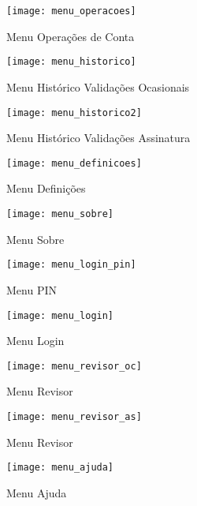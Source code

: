 \begin{figure}[ht]
\begin{minipage}[b]{0.31\linewidth}
\centering
\texttt{[image: menu\_operacoes]}
    \caption{Menu Operações de Conta}
    \label{fig:menu_operacoes}
\end{minipage}
\hspace{0.25cm}
\begin{minipage}[b]{0.31\linewidth}
\centering
    \texttt{[image: menu\_historico]}
    \caption{Menu Histórico Validações Ocasionais}
    \label{fig:menu_historico}
\end{minipage}
\hspace{0.25cm}
\begin{minipage}[b]{0.31\linewidth}
\centering
    \texttt{[image: menu\_historico2]}
    \caption{Menu Histórico Validações Assinatura}
    \label{fig:menu_historico2}
\end{minipage}
\end{figure}

\begin{figure}[ht]
\begin{minipage}[b]{0.45\linewidth}
\centering
\texttt{[image: menu\_definicoes]}
    \caption{Menu Definições}
    \label{fig:menu_definicoes}
\end{minipage}
\hspace{0.5cm}
\begin{minipage}[b]{0.45\linewidth}
\centering
    \texttt{[image: menu\_sobre]}
    \caption{Menu Sobre}
    \label{fig:menu_sobre}
\end{minipage}
\end{figure}

\begin{figure}[ht]
\begin{minipage}[b]{0.45\linewidth}
\centering
\texttt{[image: menu\_login\_pin]}
    \caption{Menu PIN}
    \label{fig:menu_login_pin}
\end{minipage}
\hspace{0.5cm}
\begin{minipage}[b]{0.45\linewidth}
\centering
    \texttt{[image: menu\_login]}
    \caption{Menu Login}
    \label{fig:menu_login}
\end{minipage}
\end{figure}

\begin{figure}[ht]
\begin{minipage}[b]{0.45\linewidth}
\centering
\texttt{[image: menu\_revisor\_oc]}
    \caption{Menu Revisor}
    \label{fig:menu_revisor_oc}
\end{minipage}
\hspace{0.5cm}
\begin{minipage}[b]{0.45\linewidth}
\centering
    \texttt{[image: menu\_revisor\_as]}
    \caption{Menu Revisor}
    \label{fig:menu_revisor_as}
\end{minipage}
\end{figure}

\begin{figure}[t]
  \begin{center}
    \leavevmode
    \texttt{[image: menu\_ajuda]}
    \caption{Menu Ajuda}
    \label{fig:menu_ajuda}
  \end{center}
\end{figure}